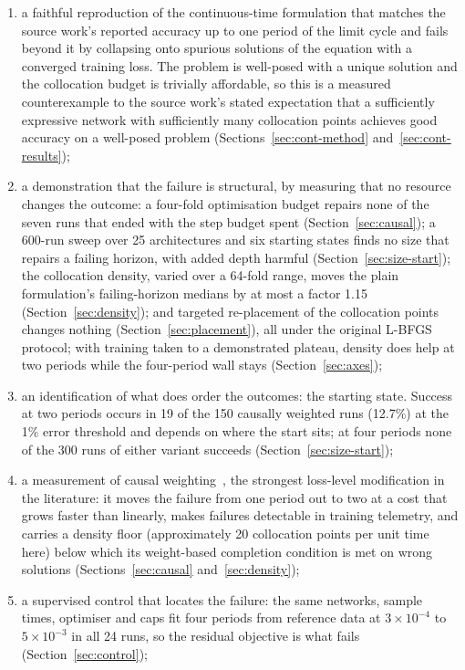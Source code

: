 \documentclass[11pt,a4paper]{article}
\begin{document}
\begin{enumerate}
  \item a faithful reproduction of the continuous-time formulation that
  matches the source work's reported accuracy up to one period of the limit
  cycle and fails beyond it by collapsing onto spurious solutions of the
  equation with a converged training loss. The problem is well-posed with a
  unique solution and the collocation budget is trivially affordable, so
  this is a measured counterexample to the source work's stated expectation
  that a sufficiently expressive network with sufficiently many collocation
  points achieves good accuracy on a well-posed problem
  (Sections~\ref{sec:cont-method} and~\ref{sec:cont-results});
  \item a demonstration that the failure is structural, by measuring that
  no resource changes the outcome: a four-fold optimisation budget repairs
  none of the seven runs that ended with the step budget spent
  (Section~\ref{sec:causal}); a 600-run sweep over 25
  architectures and six starting states finds no size that repairs a
  failing horizon, with added depth harmful
  (Section~\ref{sec:size-start}); the collocation density, varied over a
  64-fold range, moves the plain formulation's failing-horizon medians by
  at most a factor 1.15 (Section~\ref{sec:density}); and targeted
  re-placement of the collocation points changes nothing (Section~\ref{sec:placement}), all under the original L-BFGS protocol; with training taken to a demonstrated plateau, density does help at two periods while the four-period wall stays (Section~\ref{sec:axes});
  \item an identification of what does order the outcomes: the starting
  state. Success at two periods occurs in 19 of the 150 causally weighted
  runs (12.7\%) at the 1\% error threshold and depends on where the start
  sits; at four periods none of the 300 runs of either variant succeeds
  (Section~\ref{sec:size-start});
  \item a measurement of causal weighting~\cite{wang2024causal}, the
  strongest loss-level modification in the literature: it moves the
  failure from one period out to two at a cost that grows faster than
  linearly, makes failures detectable in training telemetry, and carries a
  density floor (approximately 20 collocation points per unit time here)
  below which its weight-based completion condition is met on wrong
  solutions (Sections~\ref{sec:causal} and~\ref{sec:density});
  \item a supervised control that locates the failure: the same networks, sample times, optimiser and caps fit four periods from reference data at $3\times10^{-4}$ to $5\times10^{-3}$ in all 24 runs, so the residual objective is what fails (Section~\ref{sec:control});

\end{enumerate}
\end{document}
